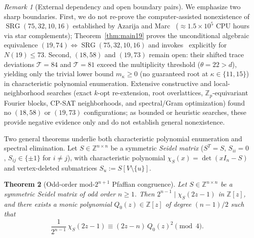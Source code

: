 \documentclass[11pt,reqno]{amsart}
\newtheorem{theorem}{Theorem}[section]
\theoremstyle{definition}
\theoremstyle{remark}
\newtheorem{remark}[theorem]{Remark}
\DeclareMathOperator{\SRG}{SRG}
\begin{document}
\begin{remark}[External dependency and open boundary pairs]\label{rem:open}
We emphasize two sharp boundaries. First, we do not re-prove the computer-assisted nonexistence of $\SRG(75, 32, 10, 16)$ established by Azarija and Marc~\cite{AzarijaMarc2018} ($\approx 1.5 \times 10^5$ CPU hours via star complements); Theorem~\ref{thm:main19} proves the unconditional algebraic equivalence $(19, 74) \Longleftrightarrow \SRG(75, 32, 10, 16)$ and invokes~\cite{AzarijaMarc2018} explicitly for $N(19) \le 73$. Second, $(18, 58)$ and $(19, 73)$ remain open: their shifted trace deviations $\mathcal{T} = 84$ and $\mathcal{T} = 81$ exceed the multiplicity threshold ($\theta = 22 > d$), yielding only the trivial lower bound $m_\kappa \ge 0$ (no guaranteed root at $\kappa \in \{11, 15\}$) in characteristic polynomial enumeration. Extensive constructive and local-neighborhood searches (exact $k$-opt re-extension, root overlattices, $\mathbb{Z}_p$-equivariant Fourier blocks, CP-SAT neighborhoods, and spectral/Gram optimization) found no $(18, 58)$ or $(19, 73)$ configurations; as bounded or heuristic searches, these provide negative evidence only and do not establish general nonexistence.
\end{remark}

Two general theorems underlie both characteristic polynomial enumeration and spectral elimination. Let $S \in \mathbb{Z}^{n \times n}$ be a symmetric \emph{Seidel matrix} ($S^T = S$, $S_{ii} = 0$, $S_{ij} \in \{\pm 1\}$ for $i \neq j$), with characteristic polynomial $\chi_S(x) = \det(xI_n - S)$ and vertex-deleted submatrices $S_u := S[V \setminus \{u\}]$.

\begin{theorem}[Odd-order mod-$2^{n+1}$ Pfaffian congruence]\label{thm:pfaffian}
Let $S \in \mathbb{Z}^{n \times n}$ be a symmetric Seidel matrix of odd order $n \ge 1$. Then $2^{n-1} \mid \chi_S(2z - 1)$ in $\mathbb{Z}[z]$, and there exists a monic polynomial $Q_0(z) \in \mathbb{Z}[z]$ of degree $(n-1)/2$ such that
\begin{equation}\label{eq:pfaffian}
  \frac{1}{2^{n-1}}\,\chi_S(2z - 1) \equiv (2z - n)\,Q_0(z)^2 \pmod{4}.
\end{equation}
\end{theorem}
\end{document}
